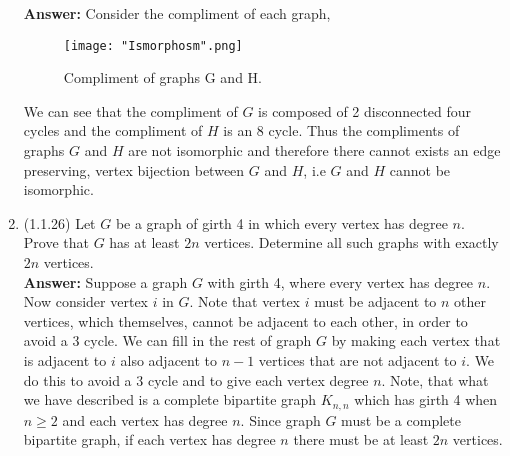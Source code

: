 \documentclass{amsart}
\begin{document}
\begin{enumerate}
\textbf{Answer:} Consider the compliment of each graph, 

\begin{figure}[H]
\caption{Compliment of graphs G and H.}
\centering
\texttt{[image: "Ismorphosm".png]}
\end{figure}

We can see that the compliment of $G$ is composed of 2 disconnected four cycles and  the compliment of $H$ is an 8 cycle. Thus the compliments of graphs $G$ and $H$ are not isomorphic and therefore there cannot exists an edge preserving, vertex bijection between $G$ and $H$, i.e $G$ and $H$ cannot be isomorphic.



	
	\vspace{0.25in}
	
\item (1.1.26) Let $G$ be a graph of girth 4 in which every vertex has degree $n$. Prove that $G$ has at least $2n$ vertices. Determine all such graphs with exactly $2n$ vertices.\\

\textbf{Answer:} Suppose a graph $G$ with girth 4, where every vertex has degree $n$. Now consider vertex $i$ in $G$. Note that vertex $i$ must be adjacent to $n$ other vertices, which themselves, cannot be adjacent to each other, in order to avoid a 3 cycle. We can fill in the rest of graph $G$ by making each vertex that is adjacent to $i$ also adjacent to $n-1$ vertices that are not adjacent to $i$. We do this to avoid a 3 cycle and to give each vertex degree $n$. Note, that what we have described is a complete bipartite graph $K_{n,n}$ which has girth 4 when $n \geq 2$ and each vertex has degree $n$. Since graph $G$ must be a complete bipartite graph, if each vertex has degree $n$ there must be at least $2n$ vertices.

 	\vspace{0.25in}
\end{enumerate}
\end{document}
